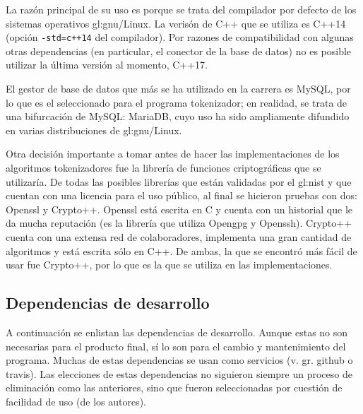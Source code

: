 
{%
  La razón principal de su uso es porque se trata del compilador por defecto de
  los sistemas operativos \acrshort{gl:gnu}/Linux. La verisón de C++ que
  se utiliza es C++14 (opción \texttt{-std=c++14} del compilador). Por razones
  de compatibilidad con algunas otras dependencias (en particular, el conector
  de la base de datos) no es posible utilizar la última versión al momento,
  C++17.
}

{%
  El gestor de base de datos que más se ha utilizado en la carrera es MySQL,
  por lo que es el seleccionado para el programa tokenizador; en realidad,
  se trata de una bifurcación de MySQL: MariaDB, cuyo uso ha sido ampliamente
  difundido en varias distribuciones de \acrshort{gl:gnu}/Linux.
}

{%
  Otra decisión importante a tomar antes de hacer las implementaciones de los
  algoritmos tokenizadores fue la librería de funciones criptográficas que
  se utilizaría. De todas las posibles librerías que están validadas
  por el \gls{gl:nist} y que cuentan con una licencia para el uso público, al
  final se hicieron pruebas con dos: Openssl y Crypto++. Openssl está escrita
  en C y cuenta con un historial que le da mucha reputación (es la librería
  que utiliza Opengpg y Openssh). Crypto++ cuenta con una extensa red de
  colaboradores, implementa una gran cantidad de algoritmos y está escrita sólo
  en C++. De ambas, la que se encontró más fácil de usar fue Crypto++, por lo
  que es la que se utiliza en las implementaciones.
}

\subsection{Dependencias de desarrollo}

A continuación se enlistan las dependencias de desarrollo.
Aunque estas no son necesarias para el producto final, sí lo son para
el cambio y mantenimiento del programa. Muchas de estas dependencias
se usan como servicios (v. gr. github o travis). Las elecciones
de estas dependencias no siguieron siempre un proceso de eliminación como las
anteriores, sino que fueron seleccionadas por cuestión de facilidad
de uso (de los autores).

